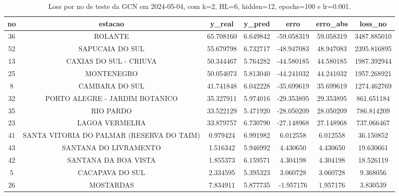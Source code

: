 \begin{table}[h]
\centering
\caption{Loss por no de teste da GCN em 2024-05-04, com k=2, HL=6, hidden=12, epochs=100 e lr=0.001.}
\label{tab:gcn_loss_k2_hl6_h12_e100_d20240504}
\begin{tabular}{ccccccc}
\toprule
no & estacao & y\_real & y\_pred & erro & erro\_abs & loss\_no \\
\midrule
36 & ROLANTE & 65.708160 & 6.649842 & -59.058319 & 59.058319 & 3487.885010 \\
52 & SAPUCAIA DO SUL & 55.679798 & 6.732717 & -48.947083 & 48.947083 & 2395.816895 \\
13 & CAXIAS DO SUL - CRIUVA & 50.344467 & 5.764282 & -44.580185 & 44.580185 & 1987.392944 \\
25 & MONTENEGRO & 50.054073 & 5.813040 & -44.241032 & 44.241032 & 1957.268921 \\
8 & CAMBARA DO SUL & 41.741848 & 6.042228 & -35.699619 & 35.699619 & 1274.462769 \\
32 & PORTO ALEGRE - JARDIM BOTANICO & 35.327911 & 5.974016 & -29.353895 & 29.353895 & 861.651184 \\
35 & RIO PARDO & 33.522129 & 5.471920 & -28.050209 & 28.050209 & 786.814209 \\
23 & LAGOA VERMELHA & 33.879757 & 6.730790 & -27.148968 & 27.148968 & 737.066467 \\
41 & SANTA VITORIA DO PALMAR (RESERVA DO TAIM) & 0.979424 & 6.991982 & 6.012558 & 6.012558 & 36.150852 \\
43 & SANTANA DO LIVRAMENTO & 1.516342 & 5.946992 & 4.430650 & 4.430650 & 19.630661 \\
42 & SANTANA DA BOA VISTA & 1.855373 & 6.159571 & 4.304198 & 4.304198 & 18.526119 \\
5 & CACAPAVA DO SUL & 2.334595 & 5.395323 & 3.060728 & 3.060728 & 9.368056 \\
26 & MOSTARDAS & 7.834911 & 5.877735 & -1.957176 & 1.957176 & 3.830539 \\
\bottomrule
\end{tabular}
\end{table}
